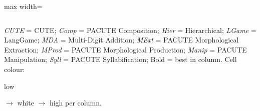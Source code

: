 \documentclass{article}
\begin{document}
\begin{table}[htbp]
\begin{threeparttable}
\begin{adjustbox}{max width=\textwidth}
\begin{tabular}{lrrrrrrrrrrrrrrrrrr}
\bottomrule
\end{tabular}
\end{adjustbox}
\begin{tablenotes}[flushleft]\footnotesize
\item \textit{CUTE} = CUTE; \textit{Comp} = PACUTE Composition; \textit{Hier} = Hierarchical; \textit{LGame} = LangGame; \textit{MDA} = Multi-Digit Addition; \textit{MExt} = PACUTE Morphological Extraction; \textit{MProd} = PACUTE Morphological Production; \textit{Manip} = PACUTE Manipulation; \textit{Syll} = PACUTE Syllabification; Bold = best in column. Cell colour: \colorbox[HTML]{F4A582}{\strut low} $\to$ white $\to$ \colorbox[HTML]{92C5DE}{high} per column.
\end{tablenotes}
\end{threeparttable}
\end{table}
\end{document}
